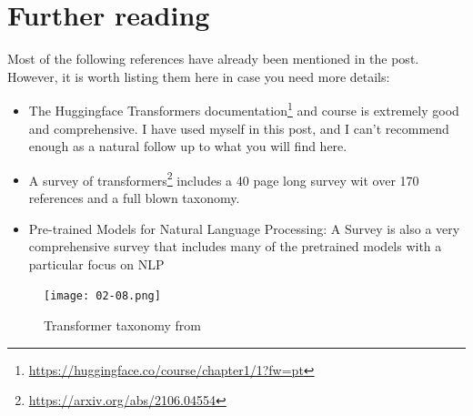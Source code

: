 \documentclass{article}
\begin{document}
\section{Further reading}

Most of the following references have already been mentioned in the post. However, it is worth listing them here in case you need more details:

\begin{itemize}
    \item The Huggingface Transformers documentation\footnote{\url{https://huggingface.co/course/chapter1/1?fw=pt}} and course is extremely good and comprehensive. I have used myself in this post, and I can’t recommend enough as a natural follow up to what you will find here.
    \item A survey of transformers\footnote{\url{https://arxiv.org/abs/2106.04554}}\cite{lin2022survey} includes a 40 page long survey wit over 170 references and a full blown taxonomy.
    \item Pre-trained Models for Natural Language Processing: A Survey\cite{qiu2020pre} is also a very comprehensive survey that includes many of the pretrained models with a particular focus on NLP

\end{itemize}


\begin{figure}
    \centering
    \texttt{[image: 02-08.png]}
    \caption{Transformer taxonomy from \cite{qiu2020pre}}
    \label{fig:taxonomy}
\end{figure}


  
\end{document}
